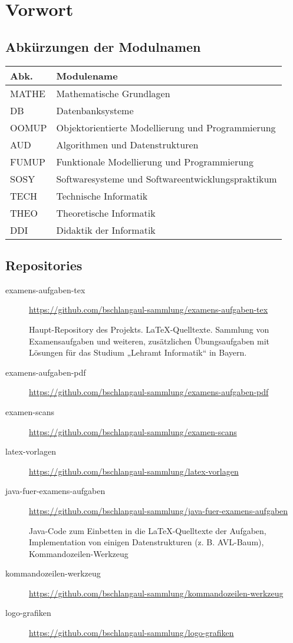 \documentclass{bschlangaul-basis}
\begin{document}
\section{Vorwort}

\subsection{Abkürzungen der Modulnamen}

\begin{tabular}{|l|l|}
Abk.  & Modulename                                          \\\hline
MATHE & Mathematische Grundlagen                            \\
DB    & Datenbanksysteme                                    \\
OOMUP & Objektorientierte Modellierung und Programmierung   \\
AUD   & Algorithmen und Datenstrukturen                     \\
FUMUP & Funktionale Modellierung und Programmierung         \\
SOSY  & Softwaresysteme und Softwareentwicklungspraktikum   \\
TECH  & Technische Informatik                               \\
THEO  & Theoretische Informatik                             \\
DDI   & Didaktik der Informatik                             \\
\end{tabular}

\subsection{Repositories}

\def\TmpRepo#1#2{\item[#1] \strut \par

{\footnotesize \url{https://github.com/bschlangaul-sammlung/#1}}

\par #2

}

\begin{description}
\TmpRepo{examens-aufgaben-tex}{Haupt-Repository des Projekts. LaTeX-Quelltexte. Sammlung von Examensaufgaben und weiteren, zusätzlichen Übungsaufgaben mit Lösungen für das Studium „Lehramt Informatik“ in Bayern.}
\TmpRepo{examens-aufgaben-pdf}{}
\TmpRepo{examen-scans}{}
\TmpRepo{latex-vorlagen}{}
\TmpRepo{java-fuer-examens-aufgaben}{Java-Code zum Einbetten in die LaTeX-Quelltexte der Aufgaben, Implementation von einigen Datenstrukturen (z. B. AVL-Baum), Kommandozeilen-Werkzeug}
\TmpRepo{kommandozeilen-werkzeug}{}
\TmpRepo{logo-grafiken}{}
\end{description}
\end{document}
